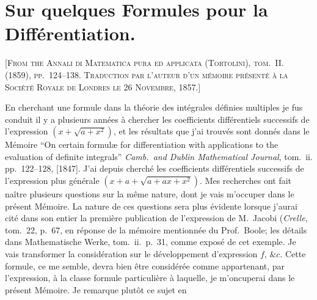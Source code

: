 \documentclass[11pt,a4paper]{book}
\begin{document}
\newpage


\setcounter{page}{134}

\section*{Sur quelques Formules pour la Différentiation.}
\label{paper:251}

\textsc{[From the Annali di Matematica pura ed applicata (Tortolini), tom.~II. (1859), pp.~124--138. Traduction par l'auteur d'un mémoire présenté à la Société Royale de Londres le 26 Novembre, 1857.]}

\medskip

En cherchant une formule dans la théorie des intégrales définies multiples je fus conduit il y a plusieurs années à chercher les coefficients différentiels successifs de l'expression $(x+\sqrt{a+x^2})$, et les résultats que j'ai trouvés sont donnés dans le Mémoire ``On certain formulæ for differentiation with applications to the evaluation of definite integrals'' \textit{Camb.~and Dublin Mathematical Journal}, tom.~ii. pp.~122--128, [1847]. J'ai depuis cherché les coefficients différentiels successifs de l'expression plus générale $(x + a + \sqrt{a + ax + x^2})$. Mes recherches ont fait naître plusieurs questions sur la même nature, dont je vais m'occuper dans le présent Mémoire. La nature de ces questions sera plus évidente lorsque j'aurai cité dans son entier la première publication de l'expression de M.~Jacobi (\textit{Crelle}, tom.~22, p.~67, en réponse de la mémoire mentionnée du Prof.~Boole; les détails dans Mathematische Werke, tom.~ii.~p.~31, comme exposé de cet exemple. Je vais transformer la considération sur le développement d'expression $f$, $\&c$. Cette formule, ce me semble, devra bien être considérée comme appartenant, par l'expression, à la classe formule particulière à laquelle, je m'oncuperai dans le présent Mémoire. Je remarque plutôt ce sujet en

\setcounter{page}{135}
\end{document}
